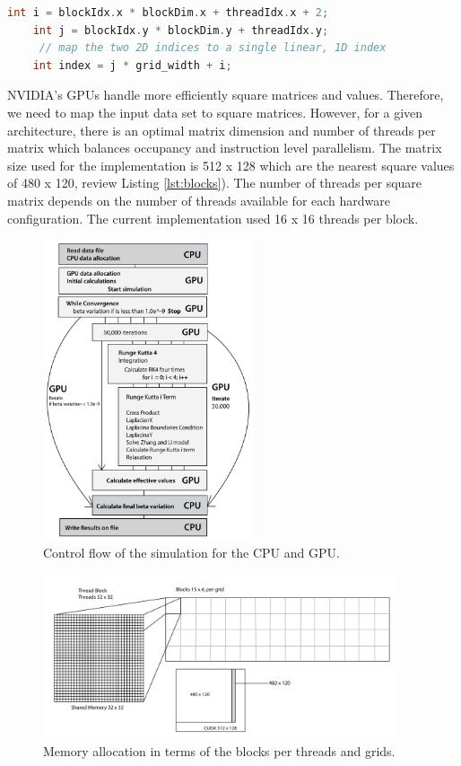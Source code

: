 \begin{lstlisting}[language=C++, label={lst:flatten}, caption={Kernel flatten 2d - 1d}]	
    int i = blockIdx.x * blockDim.x + threadIdx.x + 2;
    int j = blockIdx.y * blockDim.y + threadIdx.y;
     // map the two 2D indices to a single linear, 1D index
    int index = j * grid_width + i; 
\end{lstlisting}


NVIDIA's GPUs handle more efficiently square matrices and values. Therefore, we need to map the input data set to square matrices. However, for a given architecture, there is an optimal matrix dimension and number of threads per matrix which balances occupancy and instruction level parallelism.  The matrix size used for the implementation is 512 x 128 which are the nearest square values of 480 x 120, review Listing  \ref{lst:blocks}). The number of threads per square matrix depends on the number of threads available for each hardware configuration. The current implementation used 16 x 16 threads per block.
 
\begin{figure}[htbp]
	\centering
		\includegraphics[width=0.55\textwidth]{Figures/flow.png}
		\smallskip
	\caption[Control flow]{Control flow of the simulation for the CPU and GPU.}
	\label{fig:flow}
\end{figure}

\begin{figure}[htbp]
	\centering
		\includegraphics[width=0.93\textwidth]{Figures/block.png}
		\smallskip
	\caption[Grid layout]{Memory allocation in terms of the blocks per threads and grids.}
	\label{fig:block}
\end{figure}


